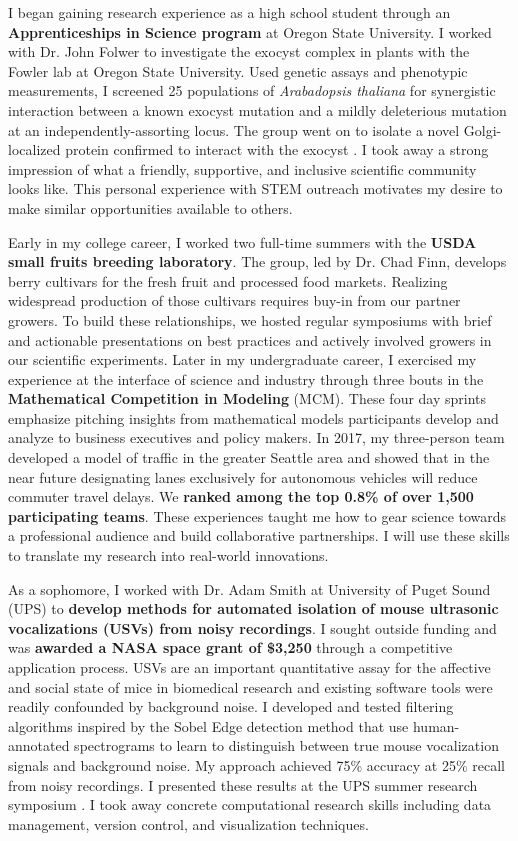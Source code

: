 \noindent
\underline{}
I began gaining research experience as a high school student through an \textbf{Apprenticeships in Science program} at Oregon State University.
I worked with Dr. John Folwer to investigate the exocyst complex in plants with the Fowler lab at Oregon State University.
Used genetic assays and phenotypic measurements, I screened 25 populations of \textit{Arabadopsis thaliana} for synergistic interaction between a known exocyst mutation and a mildly deleterious mutation at an independently-assorting locus.
The group went on to isolate a novel Golgi-localized protein confirmed to interact with the exocyst \cite{fowler}.
I took away a strong impression of what a friendly, supportive, and inclusive scientific community looks like.
This personal experience with STEM outreach motivates my desire to make similar opportunities available to others.

Early in my college career, I worked two full-time summers with the \textbf{USDA small fruits breeding laboratory}.
The group, led by Dr. Chad Finn, develops berry cultivars for the fresh fruit and processed food markets.
Realizing widespread production of those cultivars requires buy-in from our partner growers.
To build these relationships, we hosted regular symposiums with brief and actionable presentations on best practices and actively involved growers in our scientific experiments.
Later in my undergraduate career, I exercised my experience at the interface of science and industry through three bouts in the \textbf{Mathematical Competition in Modeling} (MCM).
These four day sprints emphasize pitching insights from mathematical models participants develop and analyze to business executives and policy makers.
In 2017, my three-person team developed a model of traffic in the greater Seattle area and showed that in the near future designating lanes exclusively for autonomous vehicles will reduce commuter travel delays.
We \textbf{ranked among the top 0.8\% of over 1,500 participating teams}.
These experiences taught me how to gear science towards a professional audience and build collaborative partnerships.
I will use these skills to translate my research into real-world innovations.

As a sophomore, I worked with Dr. Adam Smith at University of Puget Sound (UPS) to \textbf{develop methods for automated isolation of mouse
ultrasonic vocalizations (USVs) from noisy recordings}.
I sought outside funding and was \textbf{awarded a NASA space grant of \$3,250} through a competitive application process.
USVs are an important quantitative assay for the affective and social state of mice in biomedical research and existing software tools were readily confounded by background noise.
I developed and tested filtering algorithms inspired by the Sobel Edge detection method that use human-annotated spectrograms to learn to distinguish between true mouse vocalization signals and background noise.
My approach achieved 75\% accuracy at 25\% recall from noisy recordings.
I presented these results at the UPS summer research symposium \cite{smith}.
I took away concrete computational research skills including data management, version control, and visualization techniques.

